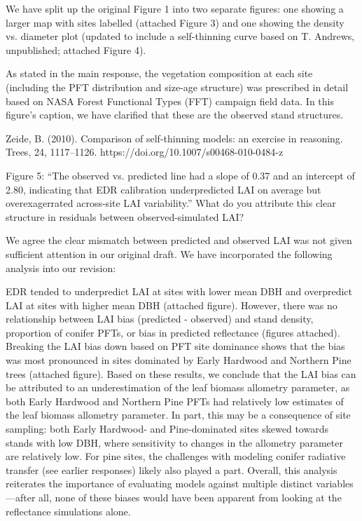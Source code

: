 We have split up the original Figure 1 into two separate figures: one showing a larger map with sites labelled (attached Figure 3) and one showing the density vs. diameter plot (updated to include a self-thinning curve based on T. Andrews, unpublished; attached Figure 4).

As stated in the main response, the vegetation composition at each site (including the PFT distribution and size-age structure) was prescribed in detail based on NASA Forest Functional Types (FFT) campaign field data. In this figure’s caption, we have clarified that these are the  observed stand structures.

\medskip
\noindent Zeide, B. (2010). Comparison of self-thinning models: an exercise in reasoning. Trees, 24, 1117–1126. https://doi.org/10.1007/s00468-010-0484-z

\begin{reviewer}
  Figure 5: “The observed vs. predicted line had a slope of 0.37 and an intercept of 2.80, indicating that EDR calibration underpredicted LAI on average but overexagerrated across-site LAI variability.” What do you attribute this clear structure in residuals between observed-simulated LAI?
\end{reviewer}

We agree the clear mismatch between predicted and observed LAI was not given sufficient attention in our original draft. We have incorporated the following analysis into our revision:

EDR tended to underpredict LAI at sites with lower mean DBH and overpredict LAI at sites with higher mean DBH (attached figure). However, there was no relationship between LAI bias (predicted - observed) and stand density, proportion of conifer PFTs, or bias in predicted reflectance (figures attached). Breaking the LAI bias down based on PFT site dominance shows that the bias was most pronounced in sites dominated by Early Hardwood and Northern Pine trees (attached figure). Based on these results, we conclude that the LAI bias can be attributed to an underestimation of the leaf biomass allometry parameter, as both Early Hardwood and Northern Pine PFTs had relatively low estimates of the leaf biomass allometry parameter. In part, this may be a consequence of site sampling: both Early Hardwood- and Pine-dominated sites skewed towards stands with low DBH, where sensitivity to changes in the allometry parameter are relatively low. For pine sites, the challenges with modeling conifer radiative transfer (see earlier responses) likely also played a part. Overall, this analysis reiterates the importance of evaluating models against multiple distinct variables---after all, none of these biases would have been apparent from looking at the reflectance simulations alone.

